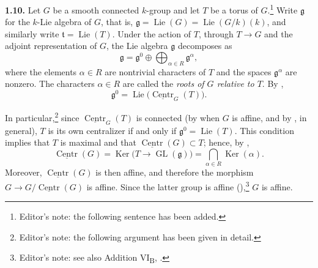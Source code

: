 \par\medskip\noindent{}\textbf{1.10.}\quad
Let \(G\) be a smooth connected \(k\)-group and let \(T\) be a torus of
\(G\).\footnote{Editor's note: the following sentence has been added.}
Write \(\mathfrak g\) for the \(k\)-Lie algebra of \(G\), that is,
\(\mathfrak g=\operatorname{Lie}(G)=\operatorname{Lie}(G/k)(k)\), and
similarly write \(\mathfrak t=\operatorname{Lie}(T)\).  Under the action
of \(T\), through \(T\longrightarrow G\) and the adjoint representation
of \(G\), the Lie algebra \(\mathfrak g\) decomposes as
\begin{equation}
  \mathfrak g
  =
  \mathfrak g^{0}
  \oplus
  \bigoplus_{\alpha\in R}\mathfrak g^{\alpha},
  \tag{1.10.1}\label{sga3:xix:paragraph:1-10:equation:1-10-1}
\end{equation}
where the elements \(\alpha\in R\) are nontrivial characters of \(T\)
and the spaces \(\mathfrak g^{\alpha}\) are nonzero.  The characters
\(\alpha\in R\) are called the \emph{roots of \(G\) relative to \(T\)}.
By ,
\begin{equation}
  \mathfrak g^{0}
  =
  \operatorname{Lie}\bigl(\underline{\operatorname{Centr}}_{G}(T)\bigr).
  \tag{1.10.2}
\end{equation}

In particular,\footnote{Editor's note: the following argument has been
given in detail.} since
\(\underline{\operatorname{Centr}}_{G}(T)\) is connected (by  when
\(G\) is affine, and by , in general), \(T\) is its own
centralizer if and only if
\(\mathfrak g^{0}=\operatorname{Lie}(T)\).  This condition implies that
\(T\) is maximal and that
\(\underline{\operatorname{Centr}}(G)\subset T\); hence, by ,
\begin{equation}
  \underline{\operatorname{Centr}}(G)
  =
  \operatorname{Ker}\bigl(T\longrightarrow
    \operatorname{GL}(\mathfrak g)\bigr)
  =
  \bigcap_{\alpha\in R}\operatorname{Ker}(\alpha).
  \tag{1.10.3}
\end{equation}
Moreover, \(\underline{\operatorname{Centr}}(G)\) is then affine, and
therefore the morphism
\(G\longrightarrow G/\underline{\operatorname{Centr}}(G)\) is affine.
Since the latter group is affine (),\footnote{Editor's
note: see also Addition VI\textsubscript{B}, .} \(G\) is affine.

